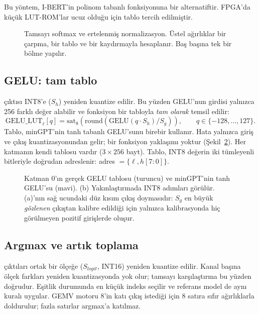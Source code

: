 \noindent Bu yöntem, I-BERT'in \cite{ibert} polinom tabanlı  fonksiyonuna bir alternatiftir. FPGA'da küçük LUT-ROM'lar ucuz olduğu için tablo tercih edilmiştir.

\begin{figure}[h]
  \centering
  \caption[Tamsayı softmax veri yolu]{Tamsayı softmax ve ertelenmiş normalizasyon. Üstel ağırlıklar bir çarpma, bir tablo ve bir kaydırmayla hesaplanır. Baş başına tek bir bölme yapılır.}
  \label{fig:softmax}
\end{figure}

\subsection{GELU: tam tablo}
 çıktısı INT8'e ($S_h$) yeniden kuantize edilir. Bu yüzden GELU'nun girdisi yalnızca 256 farklı değer alabilir ve fonksiyon bir tabloyla \emph{tam olarak} temsil edilir:
\begin{equation}
  \mathrm{GELU\_LUT}_{\ell}[q] = \mathrm{sat}_8\left( \mathrm{round}\left( \mathrm{GELU}(q \cdot S_h)/S_g \right) \right), \qquad q \in \{-128, \dots, 127\}.
\end{equation}
Tablo, minGPT'nin tanh tabanlı GELU'sunu birebir kullanır. Hata yalnızca giriş ve çıkış kuantizasyonundan gelir; bir fonksiyon yaklaşımı yoktur (Şekil~\ref{fig:gelu}). Her katmanın kendi tablosu vardır ($3\times256$ bayt). Tablo, INT8 değerin iki tümleyenli bitleriyle doğrudan adreslenir: adres $= \{\ell, h[7{:}0]\}$.

\begin{figure}[h]
  \centering
  \caption[GELU ve INT8 GELU tablosu]{Katman 0'ın gerçek GELU tablosu (turuncu) ve minGPT'nin tanh GELU'su (mavi). (b) Yakınlaştırmada INT8 adımları görülür. (a)'nın sağ ucundaki düz kısım çıkış doymasıdır: $S_g$ en büyük \emph{gözlenen} çıkıştan kalibre edildiği için yalnızca kalibrasyonda hiç görülmeyen pozitif girişlerde oluşur.}
  \label{fig:gelu}
\end{figure}

\subsection{Argmax ve artık toplama}
 çıktıları ortak bir ölçeğe ($S_{logit}$, INT16) yeniden kuantize edilir. Kanal başına ölçek farkları yeniden kuantizasyonda yok olur; tamsayı karşılaştırma bu yüzden doğrudur. Eşitlik durumunda en küçük indeks seçilir ve referans model de aynı kuralı uygular. GEMV motoru 8'in katı çıkış istediği için  8 satıra sıfır ağırlıklarla doldurulur; fazla satırlar argmax'a katılmaz.

